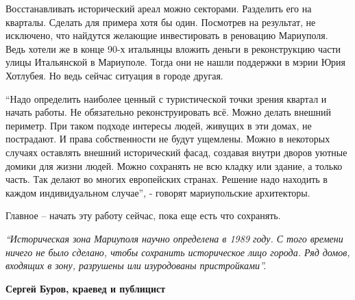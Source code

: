 Восстанавливать исторический ареал можно секторами. Разделить его на кварталы.
Сделать для примера хотя бы один. Посмотрев на результат, не исключено, что
найдутся желающие инвестировать в реновацию Мариуполя. Ведь хотели же в конце
90-х итальянцы вложить деньги в реконструкцию части улицы Итальянской в
Мариуполе. Тогда они не нашли поддержки в мэрии Юрия Хотлубея. Но ведь сейчас
ситуация в городе другая.

\enquote{Надо определить наиболее ценный с туристической точки зрения квартал и
начать работы. Не обязательно реконструировать всё. Можно делать внешний
периметр. При таком подходе интересы людей, живущих в эти домах, не пострадают.
И права собственности не будут ущемлены. Можно в некоторых случаях оставлять
внешний исторический фасад, создавая внутри дворов уютные домики для жизни
людей. Можно сохранять не всю кладку или здание, а только часть. Так делают во
многих европейских странах. Решение надо находить в каждом индивидуальном
случае}, - говорят мариупольские архитекторы.

Главное – начать эту работу сейчас, пока еще есть что сохранять.

\begin{leftbar}
\em
\enquote{Историческая зона Мариуполя научно определена в 1989 году. С того времени
ничего не было сделано, чтобы сохранить историческое лицо города. Ряд домов,
входящих в зону, разрушены или изуродованы пристройками}.
\bigskip

\textbf{Сергей Буров, краевед и публицист}
\end{leftbar}
